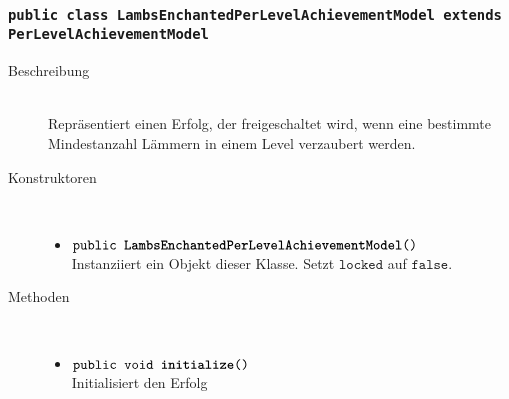 		\subsubsection{\normalfont \texttt{public class \textbf{LambsEnchantedPerLevelAchievementModel} extends PerLevelAchievementModel}}
		
		\begin{description}
		\item[Beschreibung] \hfill \\ Repräsentiert einen Erfolg, der freigeschaltet wird, wenn eine bestimmte Mindestanzahl Lämmern in einem Level verzaubert werden.
			
		\item[Konstruktoren] \hfill \\
			\vspace{-.8cm}
			\begin{itemize}
				\item $\texttt{public \textbf{LambsEnchantedPerLevelAchievementModel}()}$ \\ Instanziiert ein Objekt dieser Klasse. Setzt $\texttt{locked}$ auf $\texttt{false}$.
			\end{itemize}
			
		\item[Methoden] \hfill \\
			\vspace{-.8cm}
			\begin{itemize}
						\item $\texttt{public void \textbf{initialize}()}$ \\ Initialisiert den Erfolg
				

\end{itemize}
\end{description}
